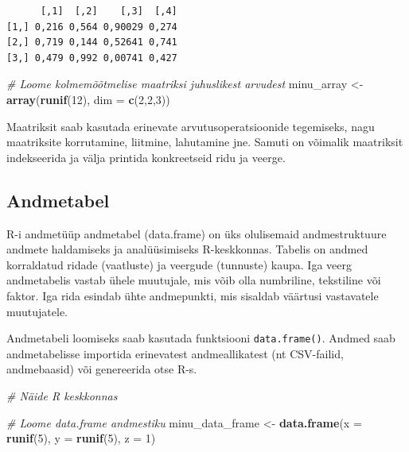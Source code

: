 \documentclass[
]{book}
\newenvironment{Shaded}{\begin{snugshade}}{\end{snugshade}}
\newcommand{\AttributeTok}[1]{\textcolor[rgb]{0.13,0.29,0.53}{#1}}
\newcommand{\CommentTok}[1]{\textcolor[rgb]{0.56,0.35,0.01}{\textit{#1}}}
\newcommand{\DecValTok}[1]{\textcolor[rgb]{0.00,0.00,0.81}{#1}}
\newcommand{\FunctionTok}[1]{\textcolor[rgb]{0.13,0.29,0.53}{\textbf{#1}}}
\newcommand{\NormalTok}[1]{#1}
\newcommand{\OtherTok}[1]{\textcolor[rgb]{0.56,0.35,0.01}{#1}}
\renewenvironment{Shaded} {\begin{snugshade}\footnotesize} {\end{snugshade}}
\theoremstyle{definition}
\theoremstyle{definition}
\theoremstyle{definition}
\theoremstyle{definition}
\theoremstyle{remark}
\begin{document}
\begin{verbatim}
      [,1]  [,2]    [,3]  [,4]
[1,] 0,216 0,564 0,90029 0,274
[2,] 0,719 0,144 0,52641 0,741
[3,] 0,479 0,992 0,00741 0,427
\end{verbatim}

\begin{Shaded}
\begin{Highlighting}[]
\CommentTok{\# Loome kolmemõõtmelise maatriksi juhuslikest arvudest}
\NormalTok{minu\_array }\OtherTok{\textless{}{-}} \FunctionTok{array}\NormalTok{(}\FunctionTok{runif}\NormalTok{(}\DecValTok{12}\NormalTok{), }\AttributeTok{dim =} \FunctionTok{c}\NormalTok{(}\DecValTok{2}\NormalTok{,}\DecValTok{2}\NormalTok{,}\DecValTok{3}\NormalTok{))}
\end{Highlighting}
\end{Shaded}

Maatriksit saab kasutada erinevate arvutusoperatsioonide tegemiseks, nagu maatriksite korrutamine, liitmine, lahutamine jne. Samuti on võimalik maatriksit indekseerida ja välja printida konkreetseid ridu ja veerge.

\subsection{Andmetabel}\label{andmetabel}

R-i andmetüüp andmetabel (data.frame) on üks olulisemaid andmestruktuure andmete haldamiseks ja analüüsimiseks R-keskkonnas. Tabelis on andmed korraldatud ridade (vaatluste) ja veergude (tunnuste) kaupa. Iga veerg andmetabelis vastab ühele muutujale, mis võib olla numbriline, tekstiline või faktor. Iga rida esindab ühte andmepunkti, mis sisaldab väärtusi vastavatele muutujatele.

Andmetabeli loomiseks saab kasutada funktsiooni \texttt{data.frame()}. Andmed saab andmetabelisse importida erinevatest andmeallikatest (nt CSV-failid, andmebaasid) või genereerida otse R-s.

\begin{Shaded}
\begin{Highlighting}[]
\CommentTok{\# Näide R keskkonnas}

\CommentTok{\# Loome data.frame andmestiku}
\NormalTok{minu\_data\_frame }\OtherTok{\textless{}{-}} \FunctionTok{data.frame}\NormalTok{(}\AttributeTok{x =} \FunctionTok{runif}\NormalTok{(}\DecValTok{5}\NormalTok{), }\AttributeTok{y =} \FunctionTok{runif}\NormalTok{(}\DecValTok{5}\NormalTok{), }\AttributeTok{z =} \DecValTok{1}\NormalTok{)}
\end{Highlighting}
\end{Shaded}
\end{document}
